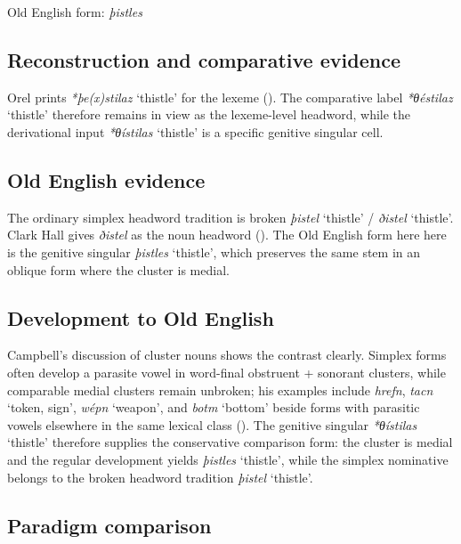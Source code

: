 \documentclass[
  british,
  a4paper,
  openany]{book}
\providecommand{\Recon}[1]{\emph{*#1}}
{\catcode`→=\active \global\def→{\ensuremath{\rightarrow}}}
\providecommand{\Recon}[1]{\emph{*#1}}
{\catcode`→=\active \global\def→{\ensuremath{\rightarrow}}}
\begin{document}
Old English form: \emph{þistles}

\subsection{Reconstruction and comparative
evidence}\label{reconstruction-and-comparative-evidence-125}

Orel prints \emph{*þe(x)stilaz} `thistle' for the lexeme
(). The comparative label
{\Recon{θéstilaz} `thistle'} therefore remains in view as the
lexeme-level headword, while the derivational input {\Recon{θístilas}
`thistle'} is a specific genitive singular cell.

\subsection{Old English evidence}\label{old-english-evidence-125}

The ordinary simplex headword tradition is broken {\emph{þistel}}
`thistle' / {\emph{ðistel}} `thistle'. Clark Hall gives {\emph{ðistel}}
as the noun headword (). The Old English form here here is the genitive singular
{\emph{þistles}} `thistle', which preserves the same stem in an oblique
form where the cluster is medial.

\subsection{Development to Old
English}\label{development-to-old-english-125}

Campbell's discussion of cluster nouns shows the contrast clearly.
Simplex forms often develop a parasite vowel in word-final obstruent +
sonorant clusters, while comparable medial clusters remain unbroken; his
examples include \emph{hrefn}, {\emph{tacn}} `token, sign',
{\emph{wépn}} `weapon', and {\emph{botm}} `bottom' beside forms with
parasitic vowels elsewhere in the same lexical class
(). The genitive singular
{\Recon{θístilas} `thistle'} therefore supplies the conservative
comparison form: the cluster is medial and the regular development
yields {\emph{þistles}} `thistle', while the simplex nominative belongs
to the broken headword tradition {\emph{þistel}} `thistle'.

\subsection{Paradigm comparison}\label{paradigm-comparison-17}
\end{document}

